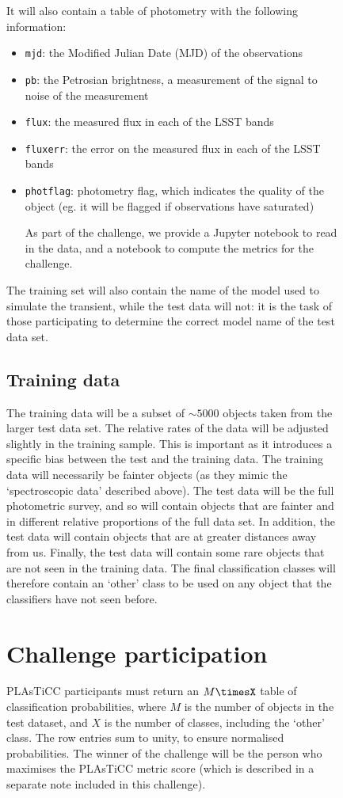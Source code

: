 \documentclass[\docopts]{\docclass}
\begin{document}
\begin{figure}[htbp!]
It will also contain a table of photometry with the following information:
\begin{itemize}
\item {\tt mjd}: the Modified Julian Date (MJD) of the observations
\item {\tt pb}: the Petrosian brightness, a measurement of the signal to noise of the measurement
\item {\tt flux}: the measured flux in each of the LSST bands
\item {\tt fluxerr}: the error on the measured flux in each of the LSST bands
\item {\tt photflag}: photometry flag, which indicates the quality of the object (eg. it will be flagged if observations have saturated)

\clearpage
As part of the challenge, we provide a Jupyter notebook to read in the data, and a notebook to compute the metrics for the challenge.
\end{itemize}

The training set will also contain the name of the model used to simulate the transient, while the test data will not: it is the task of those participating to determine the correct model name of the test data set.

\subsection{Training data}
The training data will be a subset of $\sim 5000$ objects taken from the larger test data set. The relative rates of the data will be adjusted slightly in the training sample. This is important as it introduces a specific bias between the test and the training data. The training data will necessarily be fainter objects (as they mimic the `spectroscopic data' described above). The test data will be the full photometric survey, and so will contain objects that are fainter and in different relative proportions of the full data set. In addition, the test data will contain objects that are at greater distances away from us.
Finally, the test data will contain some rare objects that are not seen in the training data. The final classification classes will therefore contain an `other' class to be used on any object that the classifiers have not seen before.




\section{Challenge participation}
\label{sec:conclusion}
PLAsTiCC participants must return an $M\timesX$ table of classification probabilities, where $M$ is the number of objects in the test dataset, and $X$ is the number of classes, including the `other' class. The row entries sum to unity, to ensure normalised probabilities. The winner of the challenge will be the person who maximises the PLAsTiCC metric score (which is described in a separate note included in this challenge). 


\end{figure}
\end{document}
